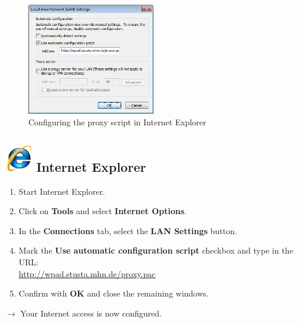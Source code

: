 \documentclass[a4paper,12pt]{scrartcl}
\newcommand{\optemph}[1]{\textbf{#1}}
\begin{document}
\begin{figure}
  \begin{center}
    \includegraphics[width=0.5\textwidth,keepaspectratio]{Bilder/Proxy_IE_EN}
  \end{center}
  \caption{Configuring the proxy script in Internet Explorer}
\end{figure}

\subsection*{\includegraphics[height=1.2cm,keepaspectratio]{Bilder/Internet_Explorer_7_Logo} Internet Explorer}
\begin{enumerate}
    \item Start Internet Explorer.
	\item Click on \optemph{Tools} and select \optemph{Internet Options}.
	\item In the \optemph{Connections} tab, select the \optemph{LAN Settings} button.
	\item Mark the \optemph{Use automatic configuration script} checkbox and type in the URL: \\ \url{http://wpad.stusta.mhn.de/proxy.pac}
	\item Confirm with \optemph{OK} and close the remaining windows.
\end{enumerate}
$\rightarrow$ Your Internet access is now configured.
\end{document}
